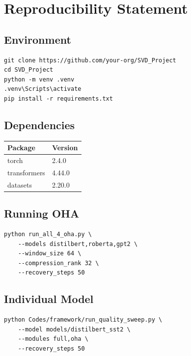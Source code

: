 
\section{Reproducibility Statement}

\subsection{Environment}

\begin{lstlisting}
git clone https://github.com/your-org/SVD_Project
cd SVD_Project
python -m venv .venv
.venv\Scripts\activate
pip install -r requirements.txt
\end{lstlisting}

\subsection{Dependencies}

\begin{table}[H]
\centering
\small
\begin{tabular}{ll}
\toprule
\textbf{Package} & \textbf{Version} \\
\midrule
torch & 2.4.0 \\
transformers & 4.44.0 \\
datasets & 2.20.0 \\
\bottomrule
\end{tabular}
\end{table}

\subsection{Running OHA}

\begin{lstlisting}
python run_all_4_oha.py \
    --models distilbert,roberta,gpt2 \
    --window_size 64 \
    --compression_rank 32 \
    --recovery_steps 50
\end{lstlisting}

\subsection{Individual Model}

\begin{lstlisting}
python Codes/framework/run_quality_sweep.py \
    --model models/distilbert_sst2 \
    --modules full,oha \
    --recovery_steps 50
\end{lstlisting}

